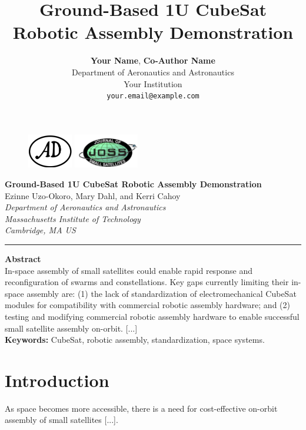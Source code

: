 \documentclass[11pt]{article}
\title{\textbf{Ground-Based 1U CubeSat Robotic Assembly Demonstration}}
\author{\textbf{Your Name}, \textbf{Co-Author Name} \\
	Department of Aeronautics and Astronautics \\
	Your Institution \\
	\texttt{your.email@example.com}}
\date{}
\begin{document}
	
	\begin{figure}[t]
		\centering
		\includegraphics[height=1.5cm]{example-logo-left.png} \hfill
		\includegraphics[height=1.5cm]{example-logo-right.png}
	\end{figure}
	
	\vspace{0.5cm}
	\begin{center}
		\Large\textbf{Ground-Based 1U CubeSat Robotic Assembly Demonstration} \\[10pt]
		\normalsize Ezinne Uzo-Okoro, Mary Dahl, and Kerri Cahoy \\[5pt]
		\textit{Department of Aeronautics and Astronautics \\ Massachusetts Institute of Technology \\ Cambridge, MA US}
	\end{center}
	
	\vspace{0.5cm}
	\rule{\textwidth}{0.4pt}
	
	\vspace{0.5cm}
	\noindent \textbf{Abstract} \\
	In-space assembly of small satellites could enable rapid response and reconfiguration of swarms and constellations. Key gaps currently limiting their in-space assembly are: (1) the lack of standardization of electromechanical CubeSat modules for compatibility with commercial robotic assembly hardware; and (2) testing and modifying commercial robotic assembly hardware to enable successful small satellite assembly on-orbit. [...] \\
	
	\vspace{0.5cm}
	\textbf{Keywords:} CubeSat, robotic assembly, standardization, space systems.
	
	\section{Introduction}
	As space becomes more accessible, there is a need for cost-effective on-orbit assembly of small satellites [...].
	
\end{document}
